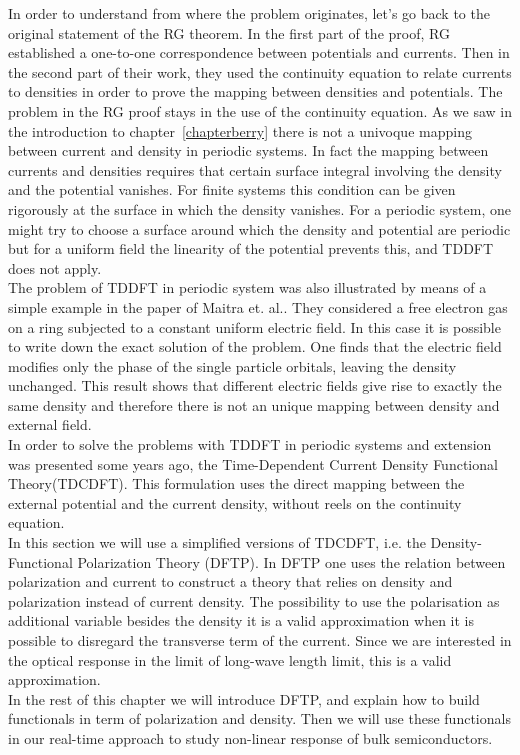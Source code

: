 In order to understand from where the problem originates, let's go back to the original statement of the RG theorem.
In the first part of the proof, RG established a one-to-one correspondence between potentials and currents.  Then in the second part of their work, they used the continuity equation to relate currents to densities in order to prove the mapping between densities and potentials.  The problem in the RG proof stays in the use of the continuity equation. As we saw in the introduction to chapter~\ref{chapterberry} there is not a univoque mapping between current and density in periodic systems. 
In fact the mapping between currents and densities requires that certain surface integral involving the density and the potential vanishes. For finite systems this condition  can be given rigorously at the surface in which the density vanishes. For a periodic system, one might try to choose a surface around which the density and potential are periodic but for a uniform field the linearity of the potential prevents this, and TDDFT does not apply. \\
The problem of TDDFT in periodic system was also illustrated  by means of a simple example in the paper of Maitra et. al.\cite{maitra2003current}. They considered a free electron gas on a ring subjected to a constant uniform electric field. In this case it is possible to write down the exact solution of the problem. One finds that the electric field modifies only the phase of the single particle orbitals, leaving the density unchanged. This result shows that different electric fields  give rise to exactly the same density and therefore there is not an unique mapping between density and external field.\\
In order to solve the problems with TDDFT in periodic systems and extension was presented some years ago, the Time-Dependent Current Density Functional Theory(TDCDFT)\cite{PhysRevA.38.1149}. This formulation uses the direct mapping between the external potential and the current density, without reels on the continuity equation.\\
In this section we will use a simplified versions of TDCDFT, i.e. the Density-Functional Polarization Theory (DFTP).  In DFTP one uses the relation between polarization and current to construct a theory that relies on density and polarization instead of current density. The possibility to use the polarisation as additional variable besides the density it is a valid approximation when it is possible to disregard the transverse term of the current. Since we are interested in the optical response in the limit of long-wave length limit, this is a valid approximation.\\
In the rest of this chapter we will introduce DFTP, and explain how to build functionals in term of polarization and density. Then we will use these functionals in our real-time approach to study non-linear response of bulk semiconductors.
